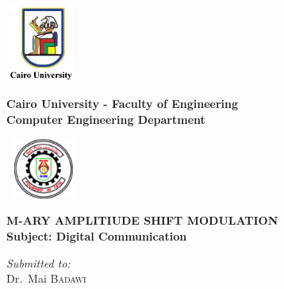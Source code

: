 \documentclass[a4paper,12pt]{report}
\begin{document}
\begin{titlepage}
    \begin{center}
        \begin{minipage}{2.5cm}
        \begin{center}
            \includegraphics[width=2.3cm,height=2.5cm]{slogan.jpg}
        \end{center}
    \end{minipage}\hfill
    \begin{minipage}{10cm}
        \begin{center}
      {\bfseries\large Cairo University - Faculty of Engineering}\\[0.1cm]
      {\bfseries\large Computer Engineering Department}\\[0.1cm]
      \end{center}
    
    \end{minipage}\hfill
    \begin{minipage}{2.5cm}
        \begin{center}
            \includegraphics[width=2.5cm,height=2cm]{logo_cufe.png}
        \end{center}
    
    \end{minipage}
    
    \vspace{5cm}
    
    {\Huge \bfseries \uppercase{M-ary Amplitiude Shift Modulation} \\[0.5cm] }
    {\LARGE \bfseries Subject: Digital Communication}
    \textsc{\Large }\\[1cm]
    
    \vspace{5cm}
    
    \begin{minipage}{15cm}
      \begin{flushleft} \huge
        \emph{Submitted to:}\\
        Dr.~Mai \textsc{Badawi}\\
      \end{flushleft}
    \end{minipage}
    

\end{center}
\end{titlepage}
\end{document}
